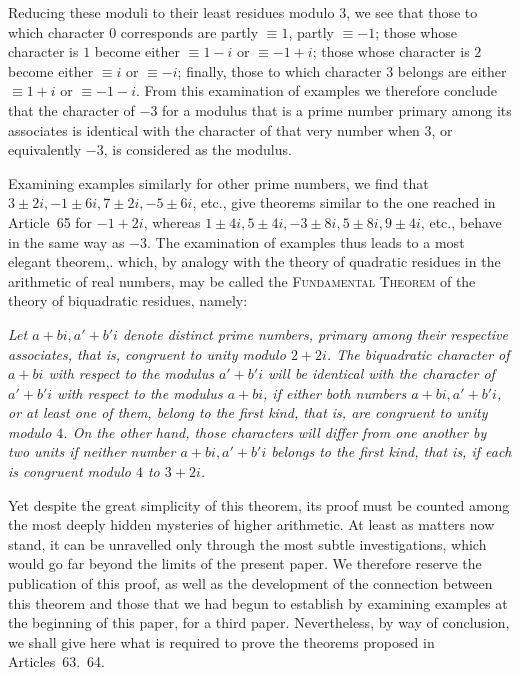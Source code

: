 Reducing these moduli to their least residues modulo $3$, we see that those to which character $0$ corresponds are partly $\equiv1$, partly $\equiv-1$; those whose character is $1$ become either $\equiv1-i$ or $\equiv-1+i$; those whose character is $2$ become either $\equiv i$ or $\equiv-i$; finally, those to which character $3$ belongs are either $\equiv1+i$ or $\equiv-1-i$. From this examination of examples we therefore conclude that the character of $-3$ for a modulus that is a prime number primary among its associates is identical with the character of that very number when $3$, or equivalently $-3$, is considered as the modulus.

Examining examples similarly for other prime numbers, we find that $3\pm2i,-1\pm6i,7\pm2i,-5\pm6i$, etc., give theorems similar to the one reached in Article~65 for $-1+2i$, whereas $1\pm4i,5\pm4i,-3\pm8i,5\pm8i,9\pm4i$, etc., behave in the same way as $-3$. The examination of examples thus leads to a most elegant theorem,. which, by analogy with the theory of quadratic residues in the arithmetic of real numbers, may be called the \textsc{Fundamental Theorem} of the theory of biquadratic residues, namely:

\emph{Let $a+bi,a'+b'i$ denote distinct prime numbers, primary among their respective associates, that is, congruent to unity modulo $2+2i$. The biquadratic character of $a+bi$ with respect to the modulus $a'+b'i$ will be identical with the character of $a'+b'i$ with respect to the modulus $a+bi$, if either both numbers $a+bi,a'+b'i$, or at least one of them, belong to the first kind, that is, are congruent to unity modulo $4$. On the other hand, those characters will differ from one another by two units if neither number $a+bi,a'+b'i$ belongs to the first kind, that is, if each is congruent modulo $4$ to $3+2i$.}

%
Yet despite the great simplicity of this theorem, its proof must be counted among the most deeply hidden mysteries of higher arithmetic. At least as matters now stand, it can be unravelled only through the most subtle investigations, which would go far beyond the limits of the present paper. We therefore reserve the publication of this proof, as well as the development of the connection between this theorem and those that we had begun to establish by examining examples at the beginning of this paper, for a third paper. Nevertheless, by way of conclusion, we shall give here what is required to prove the theorems proposed in Articles~63.~64.

